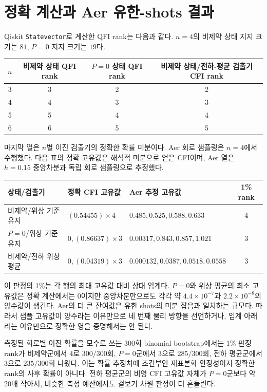 \documentclass[11pt,a4paper]{article}
\begin{document}
\section{정확 계산과 Aer 유한-shots 결과}
Qiskit \texttt{Statevector}로 계산한 QFI rank는 다음과 같다.
$n=4$의 비제약 상태 지지 크기는 $81$, $P=0$ 지지 크기는 $19$다.
\begin{center}
\begin{tabular}{@{}cccc@{}}
\toprule
$n$ & 비제약 상태 QFI rank & $P=0$ 상태 QFI rank & 비제약 상태/전하-평균 검출기 CFI rank \\
\midrule
3 & 3 & 2 & 2 \\
4 & 4 & 3 & 3 \\
5 & 5 & 4 & 4 \\
6 & 6 & 5 & 5 \\
\bottomrule
\end{tabular}
\end{center}
마지막 열은 $n$별 이진 검출기의 정확한 확률 미분이다.
Aer 회로 샘플링은 $n=4$에서 수행했다. 다음 표의 정확 고유값은
해석적 미분으로 얻은 CFI이며, Aer 열은 $h=0.15$ 중앙차분과
독립 회로 샘플링으로 추정했다.
\begin{center}
\begin{tabular}{@{}p{42mm}p{37mm}p{53mm}c@{}}
\toprule
상태/검출기 & 정확 CFI 고유값 & Aer 추정 고유값 & 1\% rank \\
\midrule
비제약/위상 기준 유지 & $(0.54455)\times4$ & $0.485,0.525,0.588,0.633$ & 4 \\
$P=0$/위상 기준 유지 & $0,(0.86637)\times3$ & $0.00317,0.843,0.857,1.021$ & 3 \\
비제약/전하 위상 평균 & $0,(0.04319)\times3$ & $0.000132,0.0387,0.0518,0.0558$ & 3 \\
\bottomrule
\end{tabular}
\end{center}
이 판정의 1\%는 각 행의 최대 고유값 대비 상대 임계다.
$P=0$와 위상 평균의 최소 고유값은 정확 계산에서는 0이지만
중앙차분만으로도 각각 약 $4.4\times10^{-7}$과
$2.2\times10^{-8}$의 양수값이 생긴다. Aer의 더 큰 잔여값은
유한 shots의 미분 잡음과 일치하는 규모다. 따라서 샘플 고유값이
양수라는 이유만으로 네 번째 물리 방향을 선언하거나, 임계 아래라는
이유만으로 정확한 영을 증명해서는 안 된다.

측정된 회로별 이진 확률을 모수로 쓰는 300회 binomial bootstrap에서는
1\% 판정 rank가 비제약군에서 $4$로 $300/300$회,
$P=0$군에서 $3$으로 $285/300$회,
전하 평균군에서 $3$으로 $235/300$회 나왔다.
이는 확률 추정치에 조건부인 재표본화 안정성이지 정확한 rank의
사후 확률이 아니다. 전하 평균군의 비영 CFI 고유값 자체가
$P=0$군보다 약 20배 작아서, 비슷한 측정 예산에서도 겉보기 차원
판정이 더 흔들린다.
\end{document}
